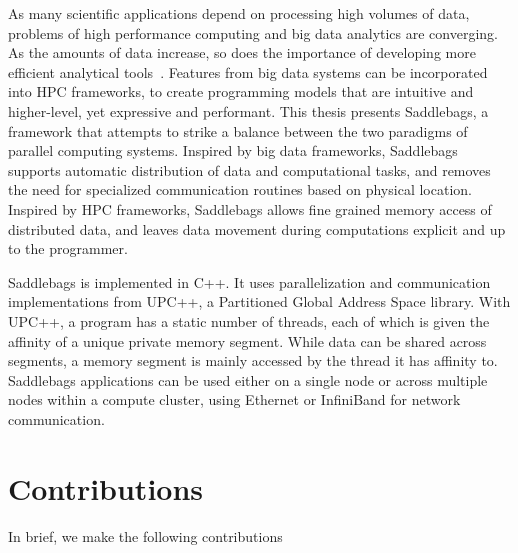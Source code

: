 \documentclass{uit-report}
\begin{document}
As many scientific applications depend on processing high volumes of data, problems of high performance computing and big data analytics are converging. As the amounts of data increase, so does the importance of developing more efficient analytical tools~\cite{hpcabds}. Features from big data systems can be incorporated into HPC frameworks, to create programming models that are intuitive and higher-level, yet expressive and performant. This thesis presents Saddlebags, a framework that attempts to strike a balance between the two paradigms of parallel computing systems. Inspired by big data frameworks, Saddlebags supports automatic distribution of data and computational tasks, and removes the need for specialized communication routines based on physical location. Inspired by HPC frameworks, Saddlebags allows fine grained memory access of distributed data, and leaves data movement during computations explicit and up to the programmer.

Saddlebags is implemented in C++. It uses parallelization and communication implementations from UPC++, a Partitioned Global Address Space library. With UPC++, a program has a static number of threads, each of which is given the affinity of a unique private memory segment. While data can be shared across segments, a memory segment is mainly accessed by the thread it has affinity to. Saddlebags applications can be used either on a single node or across multiple nodes within a compute cluster, using Ethernet or InfiniBand for network communication.









\newpage
\section{Contributions}
In brief, we make the following contributions
\end{document}
